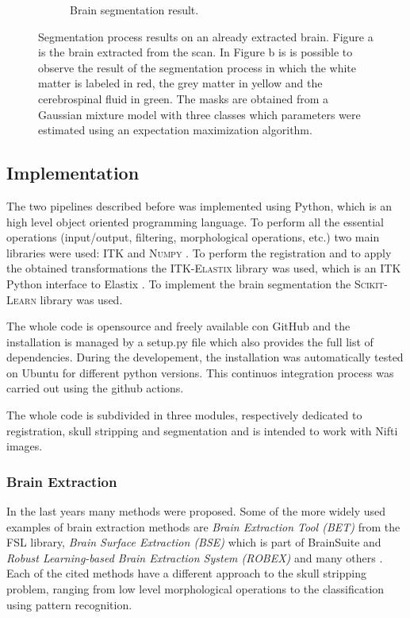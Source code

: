 \documentclass{standalone}
\begin{document}
\begin{figure}[h!]
\begin{subfigure}[b]{0.495\textwidth}
             \caption{Brain segmentation result.}
        \end{subfigure}
        \caption{Segmentation process results on an already extracted brain. Figure a is the brain extracted from the scan. In Figure b is is possible to observe the result of the segmentation process in which the white matter is labeled in red, the grey matter in yellow and the cerebrospinal fluid in green.
        The masks are obtained from a Gaussian mixture model with three classes which parameters were estimated using an expectation maximization algorithm.}\label{fig:postprocessing}
\end{figure}

\subsection{Implementation}

The two pipelines described before was implemented using Python, which is an high level object oriented programming language. To perform all the essential operations (input/output, filtering, morphological operations, etc.) two main libraries were used: \textsc{ITK} \cite{ART:ITK} and \textsc{Numpy} \cite{Numpy}. To perform the registration and to apply the obtained transformations the \textsc{ITK-Elastix} \cite{ITK-Elastix} library was used, which is an ITK Python interface to Elastix \cite{ART:Elastix}. To implement the brain segmentation the \textsc{Scikit-Learn}\cite{scikit-learn} library was used. 

The whole code is opensource and freely available con GitHub \cite{Neuroradiomics} and the installation is managed by a setup.py file which also provides the full list of dependencies.
During the developement, the installation was automatically tested on Ubuntu for different python versions. This continuos integration process was carried out using the github actions.

The whole code is subdivided in three modules, respectively dedicated to registration, skull stripping and segmentation and is intended to work with Nifti images.

\subsubsection{Brain Extraction}

In the last years many methods were proposed. Some of the more widely used examples of brain extraction methods are \emph{Brain Extraction Tool (BET)} from the FSL library, \emph{Brain Surface Extraction (BSE)} which is part of BrainSuite and \emph{Robust Learning-based Brain Extraction System (ROBEX)} and many others \cite{ART:Han}.
Each of the cited methods have a different approach to the skull stripping problem, ranging from low level morphological operations to the classification using pattern recognition.
\end{document}
